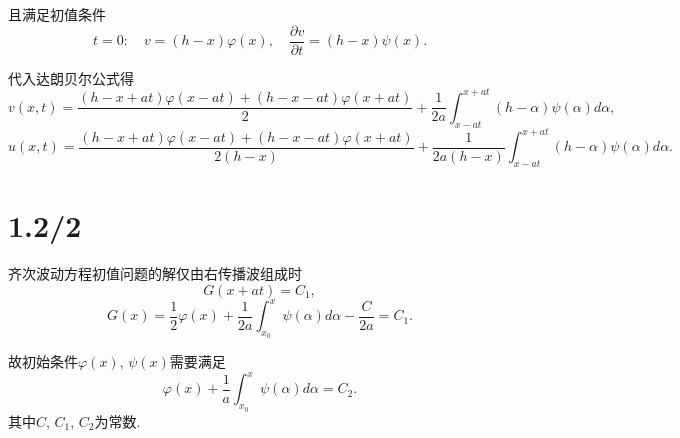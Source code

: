 \documentclass[11pt,a4paper]{article}
\begin{document}
且满足初值条件
$$t=0:\quad v=(h-x)\varphi(x),\quad \frac{\partial v}{\partial t}=(h-x)\psi(x).$$

代入达朗贝尔公式得
$$v(x,t)=\frac{(h-x+at)\varphi(x-at)+(h-x-at)\varphi(x+at)}{2}+\frac{1}{2a}\int_{x-at}^{x+at}(h-\alpha)\psi(\alpha)d\alpha,$$
$$u(x,t)=\frac{(h-x+at)\varphi(x-at)+(h-x-at)\varphi(x+at)}{2(h-x)}+\frac{1}{2a(h-x)}\int_{x-at}^{x+at}(h-\alpha)\psi(\alpha)d\alpha.$$

\section{1.2/2}

齐次波动方程初值问题的解仅由右传播波组成时
$$G(x+at)=C_1,$$
$$G(x)=\frac{1}{2}\varphi(x)+\frac{1}{2a}\int_{x_0}^x\psi(\alpha)d\alpha-\frac{C}{2a}=C_1.$$

故初始条件$\varphi(x)$, $\psi(x)$需要满足
$$\varphi(x)+\frac{1}{a}\int_{x_0}^x\psi(\alpha)d\alpha=C_2.$$
其中$C$, $C_1$, $C_2$为常数.
\end{document}
